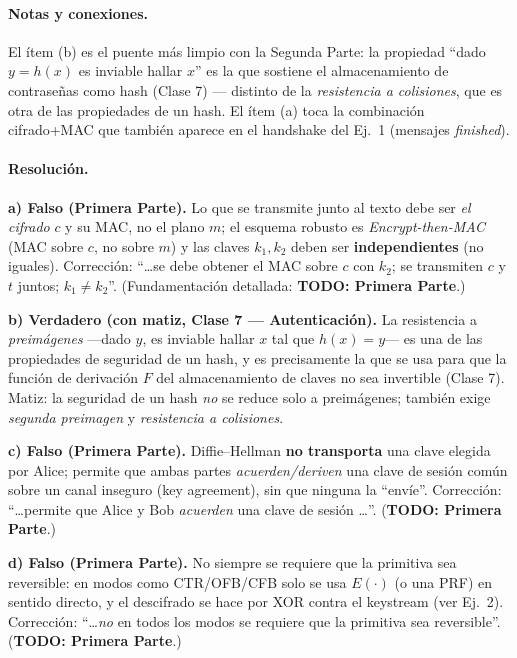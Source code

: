 \paragraph{Notas y conexiones.}
El ítem (b) es el puente más limpio con la Segunda Parte: la propiedad ``dado $y=h(x)$ es inviable
hallar $x$'' es la que sostiene el almacenamiento de contraseñas como hash (Clase 7) — distinto de
la \emph{resistencia a colisiones}, que es otra de las propiedades de un hash. El ítem (a) toca la
combinación cifrado+MAC que también aparece en el handshake del Ej.~1 (mensajes \emph{finished}).

\paragraph{Resolución.}
\textbf{a) Falso (Primera Parte).} Lo que se transmite junto al texto debe ser \emph{el cifrado}
$c$ y su MAC, no el plano $m$; el esquema robusto es \emph{Encrypt-then-MAC} (MAC sobre $c$,
no sobre $m$) y las claves $k_1,k_2$ deben ser \textbf{independientes} (no iguales). Corrección:
``\dots se debe obtener el MAC sobre $c$ con $k_2$; se transmiten $c$ y $t$ juntos; $k_1\neq k_2$''.
(Fundamentación detallada: \textbf{TODO: Primera Parte}.)

\textbf{b) Verdadero (con matiz, Clase 7 — Autenticación).} La resistencia a \emph{preimágenes}
—dado $y$, es inviable hallar $x$ tal que $h(x)=y$— es una de las propiedades de seguridad de un
hash, y es precisamente la que se usa para que la función de derivación $F$ del almacenamiento de
claves no sea invertible (Clase 7). Matiz: la seguridad de un hash \emph{no} se reduce solo a
preimágenes; también exige \emph{segunda preimagen} y \emph{resistencia a colisiones}.

\textbf{c) Falso (Primera Parte).} Diffie--Hellman \textbf{no transporta} una clave elegida por
Alice; permite que ambas partes \emph{acuerden/deriven} una clave de sesión común sobre un canal
inseguro (key agreement), sin que ninguna la ``envíe''. Corrección: ``\dots permite que Alice y
Bob \emph{acuerden} una clave de sesión \dots''. (\textbf{TODO: Primera Parte}.)

\textbf{d) Falso (Primera Parte).} No siempre se requiere que la primitiva sea reversible: en modos
como CTR/OFB/CFB solo se usa $E(\cdot)$ (o una PRF) en sentido directo, y el descifrado se hace por
XOR contra el keystream (ver Ej.~2). Corrección: ``\dots \emph{no} en todos los modos se requiere
que la primitiva sea reversible''. (\textbf{TODO: Primera Parte}.)
